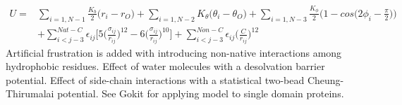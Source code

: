 \documentclass[a0paper,portrait]{baposter}
\begin{document}
\begin{poster}
{\begin{equation}
\begin{aligned}
U = &
\sum_{i=1,N-1}\frac{K_b}{2}\big(r_i-r_O\big) + \sum_{i=1,N-2}K{_\theta} \big( \theta _i - \theta_O\big )  + \sum_{i=1,N-3}\frac{K_{\phi}}{2}\big( 1-cos\big( 2\phi_i - \frac{\pi}{2}\big)\big) \\ 
  & +\sum_{i<j-3}^{Nat-C}\epsilon_{ij}\Big[5\Big( \frac{\sigma_{ij}}{r_{ij}}\Big)^{12} - 6\Big( \frac{\sigma_{ij}}{r_{ij}}\Big)^{10}  \Big] + \sum_{i<j-3}^{Non-C}\epsilon_{ij}\Big(\frac{C}{r_{ij}}\Big)^{12}
  \label{eq:eq1}
\end{aligned}
\end{equation}
Artificial frustration is added with introducing non-native interactions among hydrophobic residues. 
Effect of water molecules with a desolvation barrier potential\cite{Chan}. Effect of side-chain interactions with a statistical two-bead Cheung-Thirumalai potential\cite{Cheung}. See Gokit\cite{Neelamraju19a} for applying model to single domain proteins.}



\end{poster}
\end{document}
